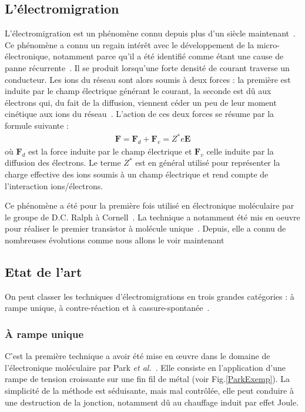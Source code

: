 \subsection{L'électromigration}
L'électromigration est un phénomène connu depuis plus d'un siècle maintenant~\cite{Gerardin1861}. Ce phénomène a connu un regain intérêt avec le développement de la micro-électronique, notamment parce qu'il a été identifié comme étant une cause de panne récurrente~\cite{Blech1967,Black1969}.
Il se produit lorsqu'une forte densité de courant traverse un conducteur. Les ions du réseau sont alors soumis à deux forces : la première est induite par le champ électrique générant le courant, la seconde est d\^u aux électrons qui, du fait de la diffusion, viennent céder un peu de leur moment cinétique aux ions du réseau~\cite{Ho1989}. L'action de ces deux forces se résume par la formule suivante :
\begin{eqnarray}
\textbf{F} = \textbf{F}_d + \textbf{F}_v = Z^*e\textbf{E} \nonumber
\end{eqnarray}
où $\textbf{F}_d$ est la force induite par le champ électrique et $\textbf{F}_v$ celle induite par la diffusion des électrons. Le terme $Z^*$ est en général utilisé pour représenter la charge effective des ions soumis à un champ électrique et rend compte de l'interaction ions/électrons.

Ce phénomène a été pour la première fois utilisé en électronique moléculaire par le groupe de D.C. Ralph à Cornell~\cite{Park1999}. La technique a notamment été mis en oeuvre pour réaliser le premier transistor à molécule unique~\cite{Park2000}. Depuis, elle a connu de nombreuses évolutions comme nous allons le voir maintenant

\subsection{Etat de l'art}
On peut classer les techniques d'électromigrations en trois grandes catégories : à rampe unique, à contre-réaction et à cassure-spontanée~\cite{Girod2012}.

\subsubsection{À rampe unique}
C'est la première technique a avoir été mise en œuvre dans le domaine de l'électronique moléculaire par Park \textit{et al.}~\cite{Park1999}. Elle consiste en l'application d'une rampe de tension croissante sur une fin fil de métal (voir Fig.\ref{ParkExemp}). La simplicité de la méthode est séduisante, mais mal contrôlée, elle peut conduire à une destruction de la jonction, notamment dû au chauffage induit par effet Joule.

